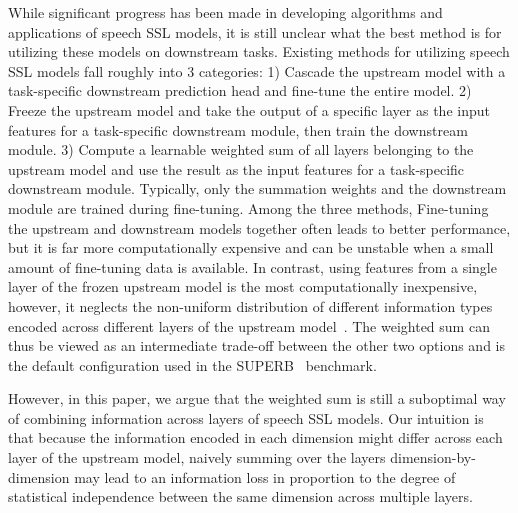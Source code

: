 While significant progress has been made in developing algorithms and applications of speech SSL models, it is still unclear what the best method is for utilizing these models on downstream tasks.
Existing methods for utilizing speech SSL models fall roughly into 3 categories:
1) Cascade the upstream model with a task-specific downstream prediction head and fine-tune the entire model.
2) Freeze the upstream model and take the output of a specific layer as the input features for a task-specific downstream module, then train the downstream module.
3) Compute a learnable weighted sum of all layers belonging to the upstream model and use the result as the input features for a task-specific downstream module. Typically, only the summation weights and the downstream module are trained during fine-tuning.
Among the three methods, Fine-tuning the upstream and downstream models together often leads to better performance, but it is far more computationally expensive and can be unstable when a small amount of fine-tuning data is available.
In contrast, using features from a single layer of the frozen upstream model is the most computationally inexpensive, however, it neglects the non-uniform distribution of different information types encoded across different layers of the upstream model~\cite{Ankita2022CCA}.
The weighted sum can thus be viewed as an intermediate trade-off between the other two options and is the default configuration used in the SUPERB~\cite{yang21c_superb} benchmark.

However, in this paper, we argue that the weighted sum is still a suboptimal way of combining information across layers of speech SSL models.
Our intuition is that because the information encoded in each dimension might differ across each layer of the upstream model, naively summing over the layers dimension-by-dimension may lead to an information loss in proportion to the degree of statistical independence between the same dimension across multiple layers.




